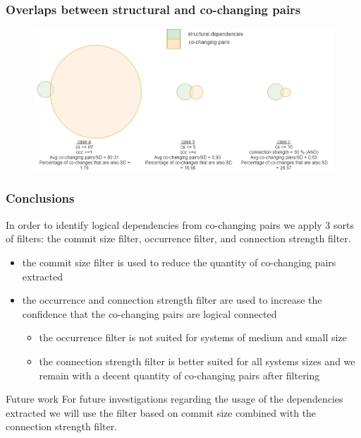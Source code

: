 \documentclass{beamer}
\begin{document}
 \begin{frame}
\frametitle{Overlaps between structural and co-changing pairs}

\begin{center}
     \begin{figure}
	\includegraphics[scale=0.35]{figvenn_OVERLAPP.png}
     \end{figure}
\end{center}

\end{frame}



 \begin{frame}
\frametitle{Conclusions}
In order to identify logical dependencies from co-changing pairs we apply 3 sorts of filters: the commit size filter, occurrence filter, and connection strength filter. 
 \begin{itemize}
        \item  the commit size filter is used to reduce the quantity of co-changing pairs extracted
        \item  the occurrence and connection strength filter are used to increase the confidence that the co-changing pairs are logical connected
	\begin{itemize}   
        \item  the occurrence filter is not suited for systems of medium and small size
	\item  the connection strength filter is better suited for all systems sizes and we remain with a decent quantity of co-changing pairs after filtering
    	\end{itemize}
    \end{itemize}
\begin{block}{Future work}
For future investigations regarding the usage of the dependencies extracted we will use the filter based on commit size combined with the connection strength filter.
\end{block}
\end{frame}
\end{document}
